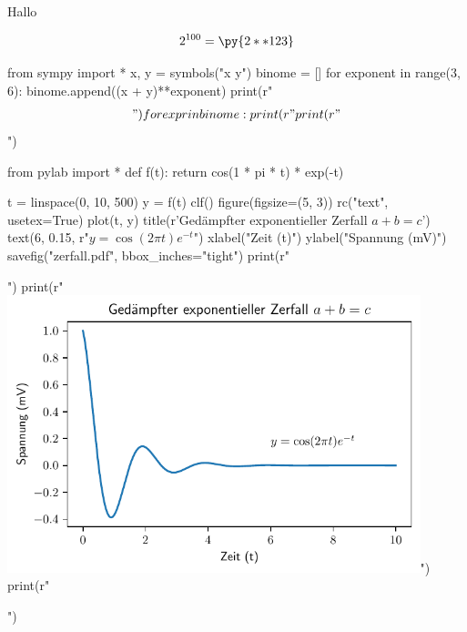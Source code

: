 \documentclass[12pt,ngerman]{scrartcl}
\begin{document}
Hallo


\[
2^{100}=\py{2**123}
\]

\begin{pycode}
from sympy import *
x, y = symbols("x y")
binome = []
for exponent in range(3, 6):
    binome.append((x + y)**exponent)
    print(r"\begin{align*}")
    for expr in binome:
        print(r"%
    print(r"\end{align*}")
\end{pycode}

\begin{pycode}
from pylab import *
def f(t):
    return cos(1 * pi * t) * exp(-t)

t = linspace(0, 10, 500)
y = f(t)
clf()
figure(figsize=(5, 3))
rc("text", usetex=True)
plot(t, y)
title(r'Ged\"ampfter exponentieller Zerfall $a+b=c$') 
text(6, 0.15, r"$y = \cos(2 \pi t) e^{-t}$")
xlabel("Zeit (t)")
ylabel("Spannung (mV)")
savefig("zerfall.pdf", bbox_inches="tight")
print(r"\begin{center}")
print(r"\includegraphics[width=0.9\textwidth]{zerfall.pdf}")
print(r"\end{center}")
\end{pycode}
\end{document}
